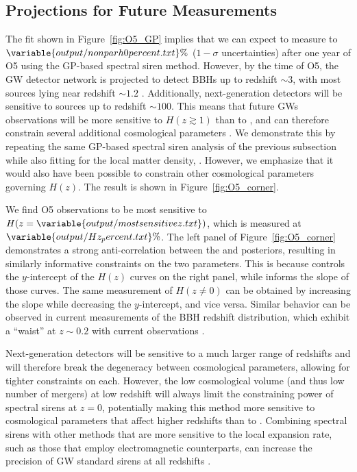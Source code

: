 \documentclass[preprint2,linenumbers]{aastex631}
\begin{document}
\subsection{Projections for Future Measurements}
The fit shown in Figure~\ref{fig:O5_GP} implies that we can expect to measure \Ho{} to $\variable{output/nonparh0percent.txt}\%$ ($1-\sigma$ uncertainties) after one year of \ac{O5} using the \ac{GP}-based spectral siren method.
However, by the time of \ac{O5}, the \ac{GW} detector network is projected to detect \acp{BBH} up to redshift $\sim 3$, with most sources lying near redshift $\sim 1.2$ \citep{chen_distance_2021}.
Additionally, next-generation detectors will be sensitive to sources up to redshift $\sim 100$.
This means that future \acp{GW} observations will be more sensitive to $H(z\gtrsim1)$ than to \Ho, and can therefore constrain several additional cosmological parameters \citep{Chen:2024gdn}.
We demonstrate this by repeating the same \ac{GP}-based spectral siren analysis of the previous subsection while also fitting for the local matter density, \Omm.
However, we emphasize that it would also have been possible to constrain other cosmological parameters governing $H(z)$.
The result is shown in Figure~\ref{fig:O5_corner}.

We find \ac{O5} observations to be most sensitive to $H(z=\variable{output/mostsensitivez.txt})$, which is measured at $\variable{output/Hz_percent.txt}\%$.
The left panel of Figure~\ref{fig:O5_corner} demonstrates a strong anti-correlation between the \Omm{} and \Ho{} posteriors, resulting in similarly informative constraints on the two parameters.
This is because \Ho{} controls the $y$-intercept of the $H(z)$ curves on the right panel, while \Omm{} informs the slope of those curves.
The same measurement of $H(z\neq0)$ can be obtained by increasing the slope while decreasing the $y$-intercept, and vice versa.
Similar behavior can be observed in current measurements of the \ac{BBH} redshift distribution, which exhibit a ``waist'' at $z\sim0.2$ with current observations \citep{abbott_population_2023, callister_parameter-free_2023}.

Next-generation detectors will be sensitive to a much larger range of redshifts \citep{et_steering_committee_einstein_2020, evans_horizon_2021} and will therefore break the degeneracy between cosmological parameters, allowing for tighter constraints on each.
However, the low cosmological volume (and thus low number of mergers) at low redshift will always limit the constraining power of spectral sirens at $z=0$, potentially making this method more sensitive to cosmological parameters that affect higher redshifts than to \Ho.
Combining spectral sirens with other methods that are more sensitive to the local expansion rate, such as those that employ electromagnetic counterparts, can increase the precision of \ac{GW} standard sirens at all redshifts \citep[e.g.][]{Chen:2024gdn}.
\end{document}
